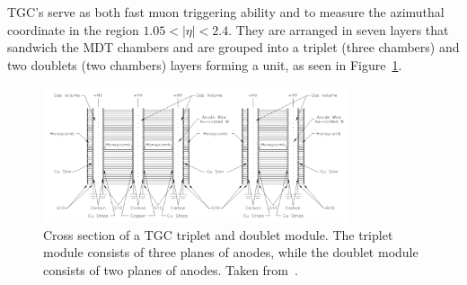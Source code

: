 




TGC's serve as both fast muon triggering ability and to measure the azimuthal coordinate in the region $1.05 < |\eta| < 2.4$. They are arranged in seven layers that sandwich the MDT chambers and are grouped into a triplet (three chambers) and two doublets (two chambers) layers forming a unit, as seen in Figure~\ref{fig:tgc_chamber}.

\begin{figure}[htp]
    \centering
    \includegraphics[width=0.8\textwidth]{figures/atlas/atlas_tgc_chamber.png}
    \caption{Cross section of a TGC triplet and doublet module. The triplet module consists of three planes of anodes, while the doublet module consists of two planes of anodes. Taken from~\cite{atlas_collaboration_paper}.}\label{fig:tgc_chamber}
\end{figure}

